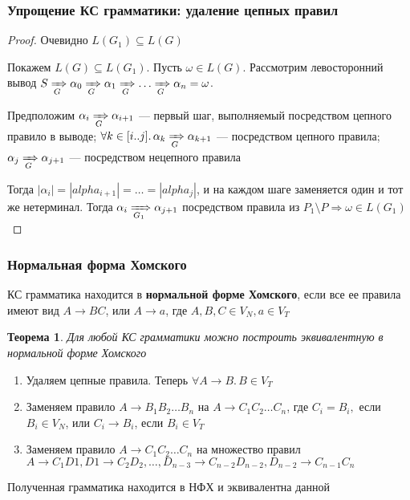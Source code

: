 \documentclass{beamer}
\newtheorem{rutheorem}{Теорема}
\newcommand{\derivegone}[1]{\xRightarrow[#1]{}}
\begin{document}
\begin{frame}[fragile]
  \transwipe[direction=90]
  \frametitle{Упрощение КС грамматики: удаление цепных правил}    
  \begin{proof}   
   Очевидно $L(G_1) \subseteq L(G)$
   
   Покажем $L(G) \subseteq L(G_1)$. Пусть $\omega \in L(G)$. Рассмотрим левосторонний вывод $S \derivegone{G} \alpha_0 \derivegone{G} \alpha_1 \derivegone{G} \dots \derivegone{G} \alpha_n = \omega$.
   
   Предположим $\alpha_i \derivegone{G} \alpha_{i+1}$ --- первый шаг, выполняемый посредством цепного правило в выводе; $\forall k \in [i..j]. \, \alpha_k \derivegone{G} \alpha_{k+1}$ --- посредством цепного правила;  $\alpha_j \derivegone{G} \alpha_{j+1}$  --- посредством нецепного правила
   
   Тогда $|\alpha_i| = |alpha_{i+1}| = \dots = |alpha_j|$, и на каждом шаге заменяется один и тот же нетерминал. Тогда $\alpha_i \derivegone{G_1} \alpha_{j+1} $ посредством правила из $P_1 \setminus P \Rightarrow \omega \in L(G_1)$
   \end{proof}
   
\end{frame}

 
\begin{frame}[fragile]
  \transwipe[direction=90]
  \frametitle{Нормальная форма Хомского}    
  КС грамматика находится в \textbf{нормальной форме Хомского}, если все ее правила имеют вид $A \rightarrow B C$, или $A \rightarrow a$, где $A,B,C \in V_N, a \in V_T$
  
  \begin{rutheorem}   
    Для любой КС грамматики можно построить эквивалентную в нормальной форме Хомского
  \end{rutheorem}

     \begin{enumerate}
    \item Удаляем цепные правила. Теперь $\forall A \rightarrow B. \, B \in V_T$
    \item Заменяем правило $A \rightarrow B_1 B_2 \dots B_n$ на $A \rightarrow C_1 C_2 \dots C_n$, где $C_i = B_i,$ если $B_i \in V_N$, или $C_i \rightarrow B_i$, если $B_i \in V_T$
    \item Заменяем правило $A \rightarrow C_1 C_2 \dots C_n$ на множество правил $A \rightarrow C_1 D1, D1 \rightarrow C_2 D_2, \dots, D_{n-3} \rightarrow C_{n-2} D_{n-2}, D_{n-2} \rightarrow C_{n-1} C_n$
  \end{enumerate}
  
        Полученная грамматика находится в НФХ и эквивалентна данной 
\end{frame}
\end{document}
